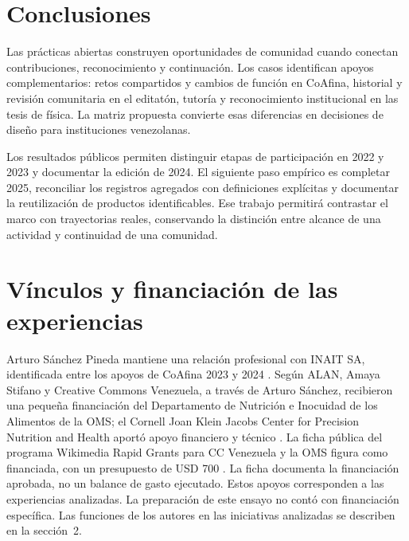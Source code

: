 \section{Conclusiones}
Las prácticas abiertas construyen oportunidades de comunidad cuando conectan contribuciones, reconocimiento y continuación. Los casos identifican apoyos complementarios: retos compartidos y cambios de función en CoAfina, historial y revisión comunitaria en el editatón, tutoría y reconocimiento institucional en las tesis de física. La matriz propuesta convierte esas diferencias en decisiones de diseño para instituciones venezolanas.

Los resultados públicos permiten distinguir etapas de participación en 2022 y 2023 y documentar la edición de 2024. El siguiente paso empírico es completar 2025, reconciliar los registros agregados con definiciones explícitas y documentar la reutilización de productos identificables. Ese trabajo permitirá contrastar el marco con trayectorias reales, conservando la distinción entre alcance de una actividad y continuidad de una comunidad.

\section*{Vínculos y financiación de las experiencias}
Arturo Sánchez Pineda mantiene una relación profesional con INAIT SA, identificada entre los apoyos de CoAfina 2023 y 2024 \cite{coafina,coafina2024}. Según ALAN, Amaya Stifano y Creative Commons Venezuela, a través de Arturo Sánchez, recibieron una pequeña financiación del Departamento de Nutrición e Inocuidad de los Alimentos de la OMS; el Cornell Joan Klein Jacobs Center for Precision Nutrition and Health aportó apoyo financiero y técnico \cite{salud}. La ficha pública del programa Wikimedia Rapid Grants para CC Venezuela y la OMS figura como financiada, con un presupuesto de USD 700 \cite{rapidgrant}. La ficha documenta la financiación aprobada, no un balance de gasto ejecutado. Estos apoyos corresponden a las experiencias analizadas. La preparación de este ensayo no contó con financiación específica. Las funciones de los autores en las iniciativas analizadas se describen en la sección~2.
